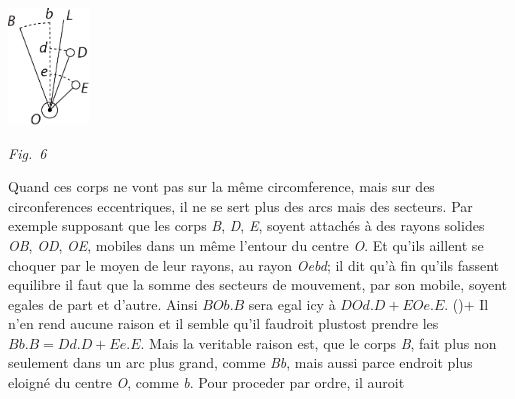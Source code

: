 %
\pend 
\newpage
%
\centerline{\includegraphics[width=0.16\textwidth]{gesamttex/edit_VIII,3/images/LH_38_212-215_d6_214r.pdf}}
\vspace{0.5em}
\centerline{\lbrack\textit{Fig.~6}\rbrack} 
\vspace{1.5em}
%
\pstart
{}
%
Quand ces corps ne vont pas sur la même circomference, mais sur des circonferences 
%
eccentriques\protect{}, il ne se sert plus des arcs 
%
mais des secteurs. Par exemple supposant que les corps \textit{B}, \textit{D}, \textit{E}, soyent attachés à
%
 des rayons solides\protect{} \textit{OB}, \textit{OD},
%
 \textit{OE}, mobiles dans un même
%
%
l'entour du centre \textit{O}. Et qu'ils aillent se choquer par le moyen de leur rayons, 
%
au rayon \textit{Oebd}; il dit qu'à fin qu'ils fassent equilibre
%
il faut que la somme des secteurs de mouvement, 
%
%
par son mobile, soyent egales de part et d'autre. Ainsi $BOb.B$ sera egal icy à $DOd.D+EOe.E$.
%
(\protect\vphantom)+ Il n'en rend aucune raison et il semble 
%
%
qu'il faudroit plustost prendre les
%
%
$Bb.B=Dd.D+Ee.E$. Mais la veritable raison est, que le corps \textit{B}, fait plus non seulement 
%
%
dans un arc plus grand, comme \textit{Bb}, mais aussi parce
%
%
endroit plus eloigné du centre \textit{O}, comme \textit{b}. Pour proceder par ordre, il auroit
